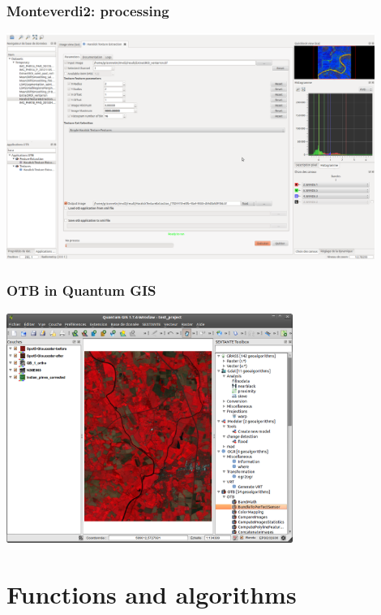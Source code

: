 \documentclass[8pt]{beamer}
\begin{document}
\begin{frame}
\frametitle{Monteverdi2: processing}
\begin{minipage}[t][6cm][t]{\textwidth}
\begin{center}
\includegraphics[width=0.9\textwidth]{images/monteverdi2-haralick.png}
\end{center}
\end{minipage}
\end{frame}

\begin{frame}
\frametitle{OTB in Quantum GIS}
\begin{minipage}[t][6cm][t]{\textwidth}
\begin{center}
\includegraphics[width=0.7\textwidth]{images/otb_qgis.png}
\end{center}
\end{minipage}
\end{frame}

\section{Functions and algorithms}
\end{document}
